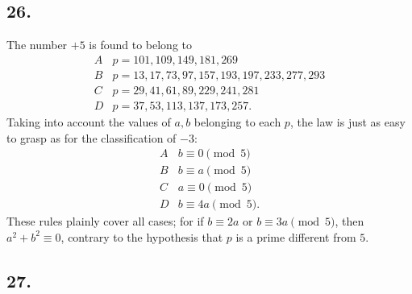 \documentclass[12pt]{article}
\begin{document}
\subsection*{26.}

The number $+5$ is found to belong to
\[
\begin{array}{l|l}
A& p=101,109,149,181,269\\
B& p=13,17,73,97,157,193,197,233,277,293\\
C& p=29,41,61,89,229,241,281\\
D& p=37,53,113,137,173,257.
\end{array}
\]
Taking into account the values of $a,b$ belonging to each $p$, the law is just as easy to grasp as for the classification of $-3$:
\[
\begin{array}{l|l}
A& b\equiv0\pmod5\\
B& b\equiv a\pmod5\\
C& a\equiv0\pmod5\\
D& b\equiv4a\pmod5.
\end{array}
\]
These rules plainly cover all cases; for if $b\equiv2a$ or $b\equiv3a\pmod5$, then $a^2+b^2\equiv0$, contrary to the hypothesis that $p$ is a prime different from $5$.

\subsection*{27.}
\end{document}
